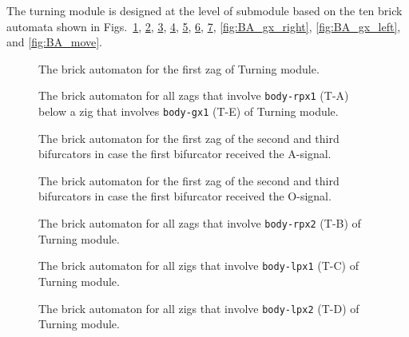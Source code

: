 \documentclass[runningheads]{llncs}
\begin{document}
The turning module is designed at the level of submodule based on the ten brick automata shown in Figs.~\ref{fig:BA_T-A_under_DFAO}, \ref{fig:BA_T-A_under_gx_left}, \ref{fig:BA_T-A_afterA}, \ref{fig:BA_T-A_afterO}, \ref{fig:BA_T-B}, \ref{fig:BA_T-C}, \ref{fig:BA_T-D}, \ref{fig:BA_gx_right}, \ref{fig:BA_gx_left}, and \ref{fig:BA_move}. 

\begin{figure}[ht]
\centering
\caption{The brick automaton for the first zag of Turning module.}
\label{fig:BA_T-A_under_DFAO}
\end{figure}

\begin{figure}[ht]
\centering
\caption{The brick automaton for all zags that involve \texttt{body-rpx1} (T-A) below a zig that involves \texttt{body-gx1} (T-E) of Turning module.}
\label{fig:BA_T-A_under_gx_left}
\end{figure}

\begin{figure}[ht]
\centering
\caption{The brick automaton for the first zag of the second and third bifurcators in case the first bifurcator received the A-signal.}
\label{fig:BA_T-A_afterA}
\end{figure}

\begin{figure}[ht]
\centering
\caption{The brick automaton for the first zag of the second and third bifurcators in case the first bifurcator received the O-signal.}
\label{fig:BA_T-A_afterO}
\end{figure}


\begin{figure}[ht]
\centering
\caption{The brick automaton for all zags that involve \texttt{body-rpx2} (T-B) of Turning module.}
\label{fig:BA_T-B}
\end{figure}

\begin{figure}[ht]
\centering
\caption{The brick automaton for all zigs that involve \texttt{body-lpx1} (T-C) of Turning module.}
\label{fig:BA_T-C}
\end{figure}

\begin{figure}[ht]
\centering
\caption{The brick automaton for all zigs that involve \texttt{body-lpx2} (T-D) of Turning module.}
\label{fig:BA_T-D}
\end{figure}
\end{document}
